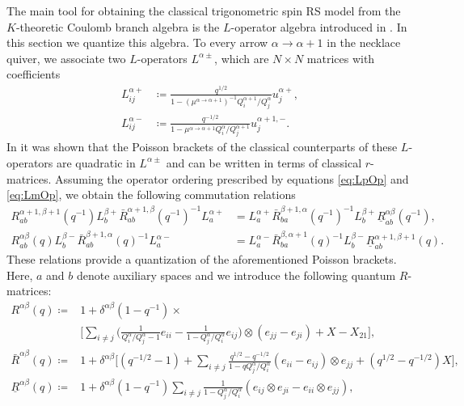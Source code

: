The main tool for obtaining the classical trigonometric spin RS model from the $K$-theoretic Coulomb branch algebra is the $L$-operator algebra introduced in \cite{arutyunov_spin_2026}.
In this section 
we quantize this algebra. To every arrow $\alpha \to \alpha+1$ in the necklace quiver, we associate two $L$-operators $L^{\alpha\pm}$, which are $N \times N$ matrices with coefficients
\begin{align}
    L_{ij}^{\alpha+} &\coloneq \frac{q^{1/2}}{1-(\mu^{\alpha\to\alpha+1})^{-1} Q_i^{\alpha+1}/Q_j^\alpha} u_j^{\alpha+}, \label{eq:LpOp} \\
    L_{ij}^{\alpha-} &\coloneq \frac{q^{-1/2}}{1-\mu^{\alpha\to\alpha+1} Q_i^\alpha/Q_j^{\alpha+1}} u_j^{\alpha+1,-}. \label{eq:LmOp}
\end{align}
In \cite{arutyunov_spin_2026} it was shown that 
the Poisson brackets of the classical counterparts of these $L$-operators are quadratic in $L^{\alpha\pm}$ and can be written in terms of classical $r$-matrices. Assuming the operator ordering prescribed by equations \eqref{eq:LpOp} and \eqref{eq:LmOp}, we obtain the following commutation relations
\begin{align}
    R_{ab}^{\alpha+1,\beta+1}(q^{-1}) L_b^{\beta+} \bar R_{ab}^{\alpha+1,\beta}(q^{-1})^{-1} L_a^{\alpha+} &= L_a^{\alpha+} \bar R_{ba}^{\beta+1,\alpha}(q^{-1})^{-1} L_b^{\beta+} \underline R_{ab}^{\alpha\beta}(q^{-1}), \label{eq:oneSiteLpAlg} \\
    R_{ab}^{\alpha\beta}(q) L_b^{\beta-} \bar R_{ab}^{\beta+1,\alpha}(q)^{-1} L_a^{\alpha-} &= L_a^{\alpha-} \bar R_{ba}^{\beta,\alpha+1}(q)^{-1} L_b^{\beta-} \underline R_{ab}^{\alpha+1,\beta+1}(q). \label{eq:oneSiteLmAlg}
\end{align}
These relations provide a quantization of the aforementioned Poisson brackets.
Here, $a$ and $b$ denote auxiliary spaces and we introduce the following quantum $R$-matrices:
\begin{align}\nonumber
    R^{\alpha\beta}(q) \coloneq{}& 1 + \delta^{\alpha\beta} (1-q^{-1}) \times \\ & \Bigg[ \sum_{i \neq j} \bigg( \frac{1}{Q_i^\alpha/Q_j^\alpha-1} e_{ii} - \frac{1}{1-Q_j^\alpha/Q_i^\alpha} e_{ij} \bigg) \otimes (e_{jj}-e_{ji}) + X - X_{21} \Bigg], \\
    \bar R^{\alpha\beta}(q) \coloneq{}& 1 + \delta^{\alpha\beta} \bigg[ (q^{-1/2}-1) + \sum_{i \neq j} \frac{q^{1/2}-q^{-1/2}}{1 - q Q_j^\alpha/Q_i^\alpha} (e_{ii}-e_{ij}) \otimes e_{jj} + (q^{1/2}-q^{-1/2}) X \bigg], \\
    \underline R^{\alpha\beta}(q) \coloneq{}& 1 + \delta^{\alpha\beta} (1-q^{-1}) \sum_{i \neq j} \frac{1}{1-Q_j^\alpha/Q_i^\alpha} (e_{ij} \otimes e_{ji} - e_{ii} \otimes e_{jj}),
\end{align}
